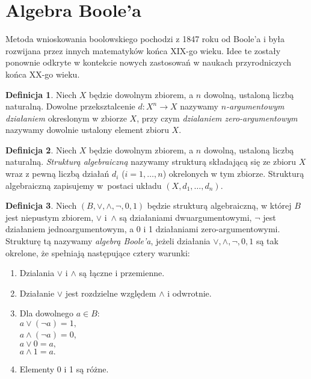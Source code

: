 \documentclass[a4paper,11pt,twoside]{article}
\theoremstyle{definition}
\newtheorem{df}{Definicja}
\begin{document}
\section*{Algebra Boole'a}

Metoda wnioskowania boolowskiego pochodzi z 1847 roku od Boole'a i była rozwijana przez innych matematyków końca XIX-go wieku. Idee te zostały ponownie odkryte w kontekcie nowych zastosowań w naukach przyrodniczych końca XX-go wieku.

\begin{df}
Niech $X$ będzie dowolnym zbiorem, a $n$ dowolną, ustaloną liczbą naturalną. Dowolne przeksztalcenie $d\colon X^n \to X$ nazywamy {\em $n$-argumentowym działaniem} okreslonym w zbiorze $X$, przy czym {\em dzialaniem zero-argumentowym} nazywamy dowolnie ustalony element zbioru $X$.
\end{df}

\begin{df}
Niech $X$ będzie dowolnym zbiorem, a $n$ dowolną, ustaloną liczbą naturalną. {\em Strukturą algebraiczną} nazywamy strukturą składającą się ze zbioru $X$ wraz z pewną liczbą działań $d_i$ ($i = 1,\dots,n$) okrelonych w tym zbiorze. Strukturą algebraiczną zapisujemy w~postaci układu $(X,d_1,\dots,d_n)$.
\end{df}

\begin{df}
Niech $(B,\vee,\wedge,\neg,0,1)$ będzie strukturą algebraiczną, w której $B$ jest niepustym zbiorem, $\vee$ i~$\wedge$ są działaniami dwuargumentowymi, $\neg$ jest działaniem jednoargumentowym, a 0 i 1 działaniami zero-argumentowymi. Strukturę tą nazywamy {\em algebrą Boole'a}, jeżeli działania $\vee,\wedge,\neg,0,1$ są tak okrelone, że spełniają następujące cztery warunki:
\end{df}

\begin{enumerate}
\item Dzialania $\vee$ i $\wedge$ są łączne i przemienne.
\item Działanie $\vee$ jest rozdzielne względem $\wedge$ i odwrotnie.
\item Dla dowolnego $a \in B$:\\
$a \vee ({\neg}a) = 1,$\\
$a \wedge ({\neg}a) = 0$,\\
$a \vee 0 = a,$\\
$a \wedge 1 = a.$
\item Elementy 0 i 1 są różne.
\end{enumerate}
\end{document}
